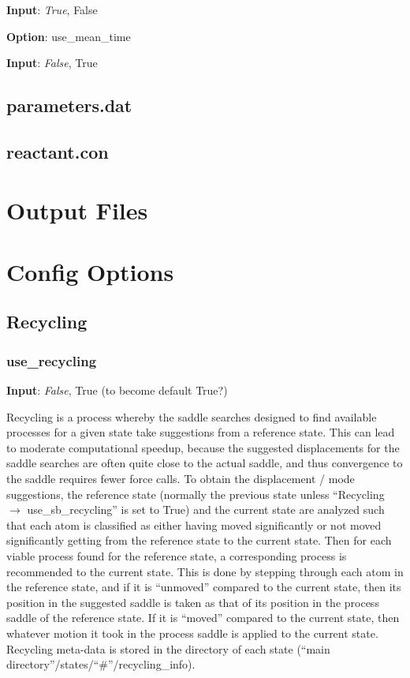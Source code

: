 \documentclass{article}
\begin{document}
\noindent\textbf{Input}:  \emph{True}, False

\noindent\textbf{Option}:  use\_mean\_time

\noindent\textbf{Input}:  \emph{False}, True

\subsection{parameters.dat}

\subsection{reactant.con}

\section{Output Files}

\section{Config Options}

\subsection{Recycling}

\subsubsection{use\_recycling}

\noindent\textbf{Input}:  \emph{False}, True (to become default True?)

Recycling is a process whereby the saddle searches designed to find available processes for a given state take suggestions from a reference state.  This can lead to moderate computational speedup, because the suggested displacements for the saddle searches are often quite close to the actual saddle, and thus convergence to the saddle requires fewer force calls.  To obtain the displacement / mode suggestions, the reference state (normally the previous state unless ``Recycling $\to$ use\_sb\_recycling'' is set to True) and the current state are analyzed such that each atom is classified as either having moved significantly or not moved significantly getting from the reference state to the current state.  Then for each viable process found for the reference state, a corresponding process is recommended to the current state.  This is done by stepping through each atom in the reference state, and if it is ``unmoved'' compared to the current state, then its position in the suggested saddle is taken as that of its position in the process saddle of the reference state.  If it is ``moved'' compared to the current state, then whatever motion it took in the process saddle is applied to the current state.  Recycling meta-data is stored in the directory of each state (``main directory''/states/``\#''/recycling\_info).
\end{document}
